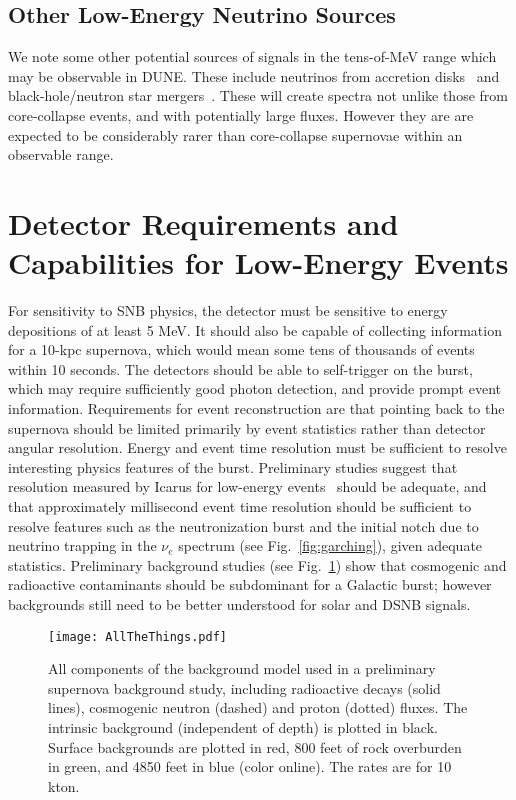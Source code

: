 \subsection{Other Low-Energy Neutrino Sources}

We note some other potential sources of signals in the tens-of-MeV range which may be observable in DUNE.  These include neutrinos from accretion disks~\cite{Caballero:2011dw} and black-hole/neutron star mergers~\cite{Caballero:2009ww}.  These will create spectra not unlike those from core-collapse events, and with potentially large fluxes.  However they are are expected to be considerably rarer than core-collapse supernovae within an observable range.


\section{Detector Requirements and Capabilities for Low-Energy Events}
\label{sec:physics-snblowe-detector-requirements}

For sensitivity to SNB physics, the detector must be sensitive to energy depositions of at least 5 MeV.  It should also be capable of collecting information for a 10-kpc supernova, which would mean some tens of thousands of events within 10 seconds.    The detectors should be able to self-trigger on the burst, which may require sufficiently good photon detection, and provide prompt event information. 
Requirements for event reconstruction are that pointing back to the supernova should be limited primarily by event statistics rather than detector angular resolution.
Energy and event time resolution must be sufficient to resolve interesting physics features of the burst.  Preliminary studies suggest that resolution measured by Icarus for low-energy events~\cite{Amoruso:2003sw} should be adequate, and that approximately millisecond event time resolution should be sufficient to resolve features such as the neutronization burst and the initial notch due to neutrino trapping in the $\nu_e$ spectrum (see Fig.~\ref{fig:garching}), given adequate statistics.   Preliminary background studies (see Fig.~\ref{fig:vicbg}) show that cosmogenic and radioactive contaminants should be subdominant for a Galactic burst; however backgrounds still need to be better understood for solar and DSNB signals.

\begin{figure}[htbp]
\begin{center}
\texttt{[image: AllTheThings.pdf]}
\caption{All components of the background model used in a preliminary supernova background study, including radioactive decays (solid lines), cosmogenic neutron (dashed) and proton (dotted) fluxes.  The intrinsic background (independent of depth) is plotted in black.  Surface backgrounds are plotted in red, 800 feet of rock overburden in green, and 4850 feet in blue (color online). The rates are for 10 kton.} 
\label{fig:vicbg}
\end{center}
\end{figure}



